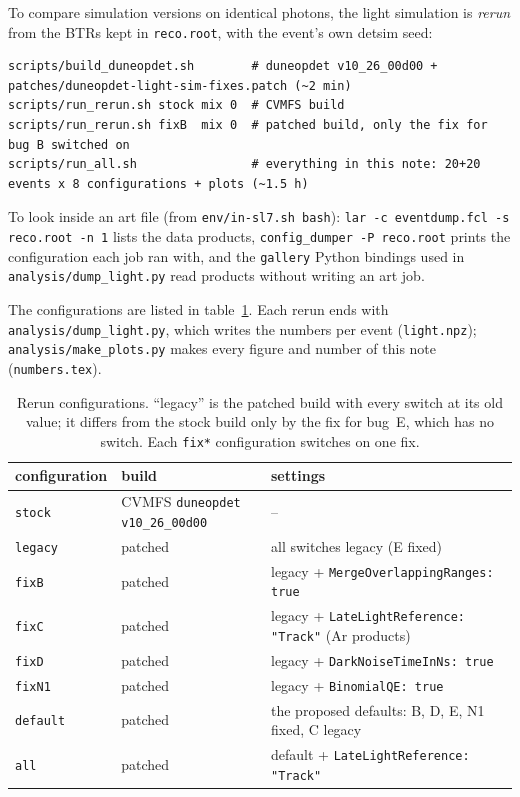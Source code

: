 \documentclass[10pt]{article}
\newcommand{\code}[1]{\texttt{#1}}
\begin{document}
To compare simulation versions on identical photons, the light simulation is \emph{rerun} from the BTRs kept in
\code{reco.root}, with the event's own detsim seed:
\begin{lstlisting}
scripts/build_duneopdet.sh        # duneopdet v10_26_00d00 + patches/duneopdet-light-sim-fixes.patch (~2 min)
scripts/run_rerun.sh stock mix 0  # CVMFS build
scripts/run_rerun.sh fixB  mix 0  # patched build, only the fix for bug B switched on
scripts/run_all.sh                # everything in this note: 20+20 events x 8 configurations + plots (~1.5 h)
\end{lstlisting}
To look inside an art file (from \code{env/in-sl7.sh bash}): \code{lar -c eventdump.fcl -s reco.root -n 1} lists the
data products, \code{config\_dumper -P reco.root} prints the configuration each job ran with, and the
\code{gallery} Python bindings used in \code{analysis/dump\_light.py} read products without writing an art job.

The configurations are listed in table~\ref{tab:configs}. Each rerun ends with \code{analysis/dump\_light.py}, which
writes the numbers per event (\code{light.npz}); \code{analysis/make\_plots.py} makes every figure and number of this
note (\code{numbers.tex}).

\begin{table}[H]\centering\small
\caption{Rerun configurations. ``legacy'' is the patched build with every switch at its old value; it differs from
the stock build only by the fix for bug~E, which has no switch. Each \code{fix*} configuration switches on one fix.}
\label{tab:configs}
\begin{tabular}{@{}l l l@{}}
\toprule
configuration & build & settings \\
\midrule
\code{stock}   & CVMFS \code{duneopdet v10\_26\_00d00} & -- \\
\code{legacy}  & patched & all switches legacy (E fixed) \\
\code{fixB}    & patched & legacy + \code{MergeOverlappingRanges: true} \\
\code{fixC}    & patched & legacy + \code{LateLightReference: "Track"} (Ar products) \\
\code{fixD}    & patched & legacy + \code{DarkNoiseTimeInNs: true} \\
\code{fixN1}   & patched & legacy + \code{BinomialQE: true} \\
\code{default} & patched & the proposed defaults: B, D, E, N1 fixed, C legacy \\
\code{all}     & patched & default + \code{LateLightReference: "Track"} \\
\bottomrule
\end{tabular}
\end{table}
\end{document}
